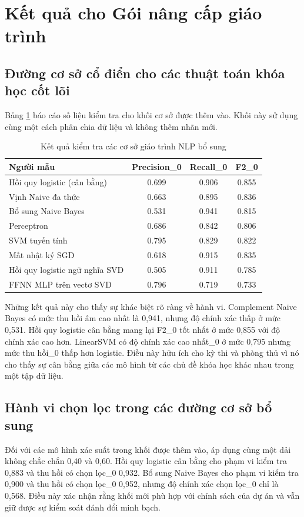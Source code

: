 \documentclass[12pt,a4paper]{article}
\begin{document}
\section{Kết quả cho Gói nâng cấp giáo trình}
\subsection{Đường cơ sở cổ điển cho các thuật toán khóa học cốt lõi}
Bảng \ref{tab:nlp_syllabus_bench} báo cáo số liệu kiểm tra cho khối cơ sở được thêm vào. Khối này sử dụng cùng một cách phân chia dữ liệu và không thêm nhãn mới.

\begin{table}[H]
\centering
\caption{Kết quả kiểm tra các cơ sở giáo trình NLP bổ sung}
\label{tab:nlp_syllabus_bench}
\begin{tabular}{lccc}
\toprule
Người mẫu & Precision\_0 & Recall\_0 & F2\_0 \\
\midrule
Hồi quy logistic (cân bằng) & 0.699 & 0.906 & 0.855 \\
Vịnh Naive đa thức & 0.663 & 0.895 & 0.836 \\
Bổ sung Naive Bayes & 0.531 & 0.941 & 0.815 \\
Perceptron & 0.686 & 0.842 & 0.806 \\
SVM tuyến tính & 0.795 & 0.829 & 0.822 \\
Mất nhật ký SGD & 0.618 & 0.915 & 0.835 \\
Hồi quy logistic ngữ nghĩa SVD & 0.505 & 0.911 & 0.785 \\
FFNN MLP trên vectơ SVD & 0.796 & 0.719 & 0.733 \\
\bottomrule
\end{tabular}
\end{table}

Những kết quả này cho thấy sự khác biệt rõ ràng về hành vi. Complement Naive Bayes có mức thu hồi âm cao nhất là 0,941, nhưng độ chính xác thấp ở mức 0,531. Hồi quy logistic cân bằng mang lại F2\_0 tốt nhất ở mức 0,855 với độ chính xác cao hơn. LinearSVM có độ chính xác cao nhất\_0 ở mức 0,795 nhưng mức thu hồi\_0 thấp hơn logistic. Điều này hữu ích cho kỳ thi và phòng thủ vì nó cho thấy sự cân bằng giữa các mô hình từ các chủ đề khóa học khác nhau trong một tập dữ liệu.

\subsection{Hành vi chọn lọc trong các đường cơ sở bổ sung}
Đối với các mô hình xác suất trong khối được thêm vào, áp dụng cùng một dải không chắc chắn 0,40 và 0,60. Hồi quy logistic cân bằng cho phạm vi kiểm tra 0,883 và thu hồi có chọn lọc\_0 0,932. Bổ sung Naive Bayes cho phạm vi kiểm tra 0,900 và thu hồi có chọn lọc\_0 0,952, nhưng độ chính xác chọn lọc\_0 chỉ là 0,568. Điều này xác nhận rằng khối mới phù hợp với chính sách của dự án và vẫn giữ được sự kiểm soát đánh đổi minh bạch.
\end{document}
